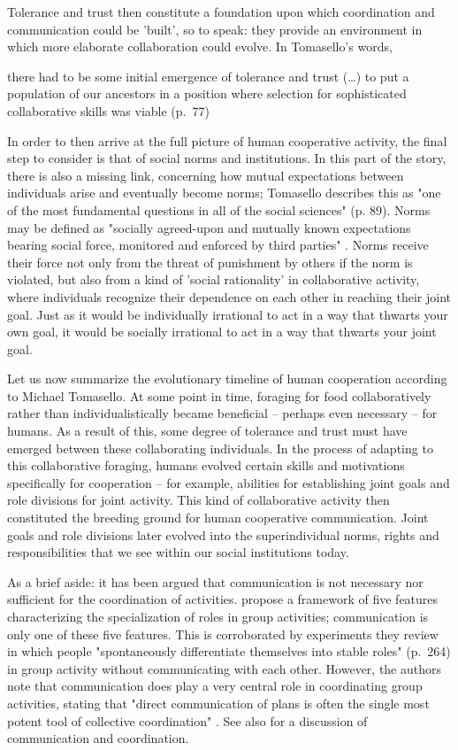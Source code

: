 Tolerance and trust then constitute a foundation upon which coordination and communication could be 'built', so to speak: they provide an environment in which more elaborate collaboration could evolve. In Tomasello's words,
\begin{quoting}
    there had to be some initial emergence of tolerance and trust (\ldots) to put a population of our ancestors in a position where selection for sophisticated collaborative skills was viable
    \hfill (p.~77)
\end{quoting}

In order to then arrive at the full picture of human cooperative activity, the final step to consider is that of social norms and institutions.
In this part of the story, there is also a missing link, concerning how mutual expectations between individuals arise and eventually become norms; Tomasello describes this as "one of the most fundamental questions in all of the social sciences" (p. 89).
Norms may be defined as "socially agreed-upon and mutually known expectations bearing social force, monitored and enforced by third parties" \citep[p.~87]{Tomasello09}. Norms receive their force not only from the threat of punishment by others if the norm is violated, but also from a kind of 'social rationality' in collaborative activity, where individuals recognize their dependence on each other in reaching their joint goal. Just as it would be individually irrational to act in a way that thwarts your own goal, it would be socially irrational to act in a way that thwarts your joint goal.

Let us now summarize the evolutionary timeline of human cooperation according to Michael Tomasello.
At some point in time, foraging for food collaboratively rather than individualistically became beneficial -- perhaps even necessary -- for humans.
As a result of this, some degree of tolerance and trust must have emerged between these collaborating individuals.
In the process of adapting to this collaborative foraging, humans evolved certain skills and motivations specifically for cooperation -- for example, abilities for establishing joint goals and role divisions for joint activity.
This kind of collaborative activity then constituted the breeding ground for human cooperative communication.
Joint goals and role divisions later evolved into the superindividual norms, rights and responsibilities that we see within our social institutions today.

As a brief aside: it has been argued that communication is not necessary nor sufficient for the coordination of activities. \citet{Goldstone24} propose a framework of five features characterizing the specialization of roles in group activities; communication is only one of these five features. This is corroborated by experiments they review in which people "spontaneously differentiate themselves into stable roles" (p.~264) in group activity without communicating with each other.
However, the authors note that communication does play a very central role in coordinating group activities, stating that "direct communication of plans is often the single most potent tool of collective coordination" \citep[p.~276]{Goldstone24}.
See also \citet{Vorobeychik17} for a discussion of communication and coordination.


